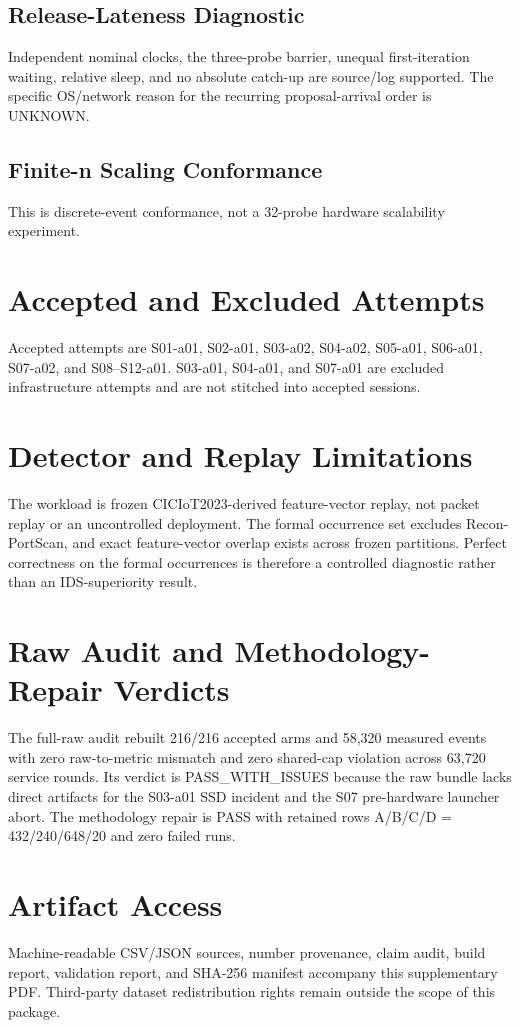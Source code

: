 \documentclass[10pt,onecolumn]{IEEEtran}
\begin{document}
\begin{landscape}
\section{Release-Lateness Diagnostic}
Independent nominal clocks, the three-probe barrier, unequal first-iteration waiting, relative sleep, and no absolute catch-up are source/log supported. The specific OS/network reason for the recurring proposal-arrival order is UNKNOWN.
\small\end{landscape}

\begin{landscape}
\section{Finite-n Scaling Conformance}
This is discrete-event conformance, not a 32-probe hardware scalability experiment.
\small\end{landscape}

\section{Accepted and Excluded Attempts}
Accepted attempts are S01-a01, S02-a01, S03-a02, S04-a02, S05-a01, S06-a01, S07-a02, and S08--S12-a01. S03-a01, S04-a01, and S07-a01 are excluded infrastructure attempts and are not stitched into accepted sessions.

\section{Detector and Replay Limitations}
The workload is frozen CICIoT2023-derived feature-vector replay, not packet replay or an uncontrolled deployment. The formal occurrence set excludes Recon-PortScan, and exact feature-vector overlap exists across frozen partitions. Perfect correctness on the formal occurrences is therefore a controlled diagnostic rather than an IDS-superiority result.

\section{Raw Audit and Methodology-Repair Verdicts}
The full-raw audit rebuilt 216/216 accepted arms and 58,320 measured events with zero raw-to-metric mismatch and zero shared-cap violation across 63,720 service rounds. Its verdict is PASS\_WITH\_ISSUES because the raw bundle lacks direct artifacts for the S03-a01 SSD incident and the S07 pre-hardware launcher abort. The methodology repair is PASS with retained rows A/B/C/D = 432/240/648/20 and zero failed runs.

\section{Artifact Access}
Machine-readable CSV/JSON sources, number provenance, claim audit, build report, validation report, and SHA-256 manifest accompany this supplementary PDF. Third-party dataset redistribution rights remain outside the scope of this package.
\end{document}
